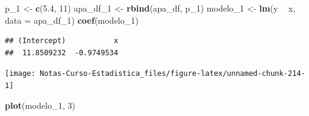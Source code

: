 \documentclass[
  12pt,
]{book}
\newenvironment{Shaded}{\begin{snugshade}}{\end{snugshade}}
\newcommand{\DataTypeTok}[1]{\textcolor[rgb]{0.13,0.29,0.53}{#1}}
\newcommand{\DecValTok}[1]{\textcolor[rgb]{0.00,0.00,0.81}{#1}}
\newcommand{\FloatTok}[1]{\textcolor[rgb]{0.00,0.00,0.81}{#1}}
\newcommand{\KeywordTok}[1]{\textcolor[rgb]{0.13,0.29,0.53}{\textbf{#1}}}
\newcommand{\NormalTok}[1]{#1}
\newcommand{\OperatorTok}[1]{\textcolor[rgb]{0.81,0.36,0.00}{\textbf{#1}}}
\newcommand{\StringTok}[1]{\textcolor[rgb]{0.31,0.60,0.02}{#1}}
\theoremstyle{definition}
\theoremstyle{definition}
\theoremstyle{definition}
\theoremstyle{remark}
\begin{document}
\begin{Shaded}
\begin{Highlighting}[]
\NormalTok{p_}\DecValTok{1}\NormalTok{ <-}\StringTok{ }\KeywordTok{c}\NormalTok{(}\FloatTok{5.4}\NormalTok{, }\DecValTok{11}\NormalTok{)}
\NormalTok{apa_df_}\DecValTok{1}\NormalTok{ <-}\StringTok{ }\KeywordTok{rbind}\NormalTok{(apa_df, p_}\DecValTok{1}\NormalTok{)}
\NormalTok{modelo_}\DecValTok{1}\NormalTok{ <-}\StringTok{ }\KeywordTok{lm}\NormalTok{(y }\OperatorTok{~}\StringTok{ }\NormalTok{x, }\DataTypeTok{data =}\NormalTok{ apa_df_}\DecValTok{1}\NormalTok{)}
\KeywordTok{coef}\NormalTok{(modelo_}\DecValTok{1}\NormalTok{)}
\end{Highlighting}
\end{Shaded}

\begin{verbatim}
## (Intercept)           x 
##  11.8509232  -0.9749534
\end{verbatim}

\begin{Shaded}
\end{Shaded}

\begin{center}\texttt{[image: Notas-Curso-Estadistica\_files/figure-latex/unnamed-chunk-214-1]} \end{center}

\begin{Shaded}
\begin{Highlighting}[]
\KeywordTok{plot}\NormalTok{(modelo_}\DecValTok{1}\NormalTok{, }\DecValTok{3}\NormalTok{)}
\end{Highlighting}
\end{Shaded}
\end{document}
